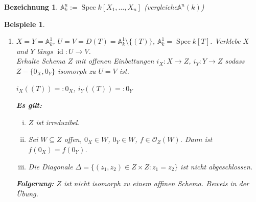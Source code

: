 \documentclass[a4paper,12pt]{report}
\theoremstyle{break}
\newtheorem{Bez}[Def]{Bezeichnung}
\theoremstyle{nonumberbreak}
\newtheorem{bspe}{Beispiele}
\theoremstyle{nonumberplain}
\DeclareMathOperator{\Spec}{Spec}
\DeclareMathOperator{\id}{id}
\newcommand{\A}{\mathbb{A}}
\newcommand{\calO}{\mathcal{O}}
\begin{document}
\begin{Bez}
$\A_k^n := \Spec k[X_1,\ldots ,X_n]$ (vergleiche$\A^n(k)$)
\end{Bez}

\begin{bspe}\begin{enumerate}[1)]\item[2)]
$X=Y=\A_k^1$, $U=V=D(T) = \A_k^1 \setminus \{(T)\}$, $\A_k^1 = \Spec k[T]$. Verklebe $X$ und $Y$ l\"angs $\id: U\to V$.\\
Erhalte Schema $Z$ mit offenen Einbettungen $i_X: X\to Z$, $i_Y: Y \to Z$ sodass $Z - \{ 0_X, 0_Y\}$ isomorph zu $U=V$ ist.
\begin{center}
$i_X\left((T)\right) =: 0_X$, $i_Y\left((T)\right) =: 0_Y$
\end{center}

\textbf{Es gilt:}\begin{enumerate}[(i)]
\item
	$Z$ ist irreduzibel.
\item
	Sei $W \subseteq Z$ offen, $0_X \in W$, $0_Y \in W$, $f\in \calO_Z(W)$. Dann ist $f(0_X) = f(0_Y)$.
\item
	Die Diagonale $\Delta = \{ (z_1,z_2) \in Z\times Z: z_1 = z_2\}$ ist nicht abgeschlossen.
\end{enumerate}
\textbf{Folgerung:} $Z$ ist nicht isomorph zu einem affinen Schema. Beweis in der \"Ubung.
\end{enumerate}\end{bspe}
\end{document}
